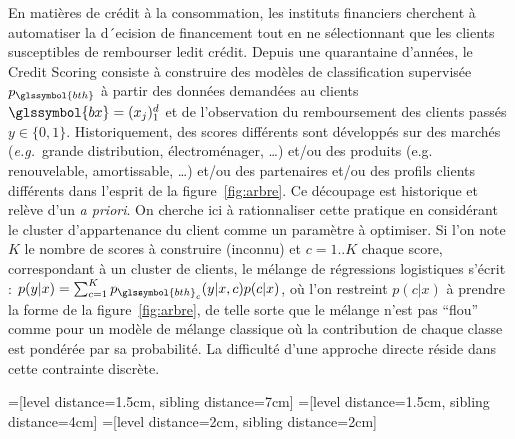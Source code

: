 En matières de crédit à la consommation, les instituts financiers cherchent à automatiser la d´ecision de financement tout en ne sélectionnant que les clients susceptibles de rembourser ledit crédit. Depuis une quarantaine d’années, le Credit Scoring consiste à construire des modèles de classification supervisée $p_{\glssymbol{bth}}$ à partir des données demandées au clients $\glssymbol{bx} = (x_j)_1^d$ et de l’observation du remboursement des clients passés $y \in \{0, 1\}$. Historiquement, des scores différents sont développés sur des marchés (\textit{e.g.}\ grande distribution, électroménager, \dots) et/ou des produits (e.g. renouvelable, amortissable, \dots) et/ou des partenaires et/ou des profils clients différents dans l’esprit de la figure~\ref{fig:arbre}. Ce découpage est historique et relève d’un \textit{a priori}. On cherche ici à rationnaliser cette pratique en considérant le cluster d’appartenance du client comme un paramètre à optimiser. Si l’on note $K$ le nombre de scores à construire (inconnu) et $c = 1..K$ chaque score, correspondant à un cluster de clients, le mélange de régressions logistiques s’écrit : $p(y|x) = \sum_{c=1}^K p_{\glssymbol{bth}_c}(y|x, c)p(c|x)$, où l’on restreint $p(c|x)$ à prendre la forme de la figure~\ref{fig:arbre}, de telle sorte que le mélange n’est pas “flou” comme pour un modèle de mélange classique où la contribution de chaque classe est pondérée par sa probabilité. La
difficulté d’une approche directe réside dans cette contrainte discrète.


=[level distance=1.5cm, sibling distance=7cm]
=[level distance=1.5cm, sibling distance=4cm]
=[level distance=2cm, sibling distance=2cm]

